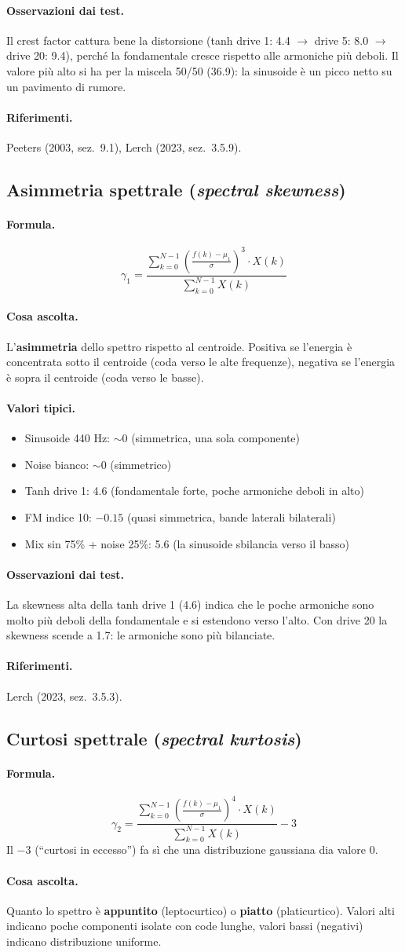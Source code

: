 \documentclass[a4paper,11pt]{article}
\newcommand{\desc}[1]{\subsection{#1}}
\newcommand{\formula}{\paragraph{Formula.}}
\newcommand{\ascolta}{\paragraph{Cosa ascolta.}}
\newcommand{\range}{\paragraph{Valori tipici.}}
\newcommand{\rif}{\paragraph{Riferimenti.}}
\newcommand{\oss}{\paragraph{Osservazioni dai test.}}
\begin{document}
\oss Il crest factor cattura bene la distorsione (tanh drive 1: 4.4 $\to$
drive 5: 8.0 $\to$ drive 20: 9.4), perché la fondamentale cresce
rispetto alle armoniche più deboli. Il valore più alto si ha per la
miscela 50/50 (36.9): la sinusoide è un picco netto su un pavimento
di rumore.

\rif Peeters (2003, sez.~9.1), Lerch (2023, sez.~3.5.9).

\desc{Asimmetria spettrale (\emph{spectral skewness})}

\formula
\[
  \gamma_1 = \frac{\displaystyle\sum_{k=0}^{N-1}
    \left(\frac{f(k) - \mu_1}{\sigma}\right)^3 \cdot X(k)}
    {\displaystyle\sum_{k=0}^{N-1} X(k)}
\]

\ascolta
L'\textbf{asimmetria} dello spettro rispetto al centroide. Positiva se
l'energia è concentrata sotto il centroide (coda verso le alte frequenze),
negativa se l'energia è sopra il centroide (coda verso le basse).

\range
\begin{itemize}[nosep]
  \item Sinusoide 440 Hz: $\sim 0$ (simmetrica, una sola componente)
  \item Noise bianco: $\sim 0$ (simmetrico)
  \item Tanh drive 1: 4.6 (fondamentale forte, poche armoniche deboli in alto)
  \item FM indice 10: $-0.15$ (quasi simmetrica, bande laterali bilaterali)
  \item Mix sin 75\% + noise 25\%: 5.6 (la sinusoide sbilancia verso il basso)
\end{itemize}

\oss La skewness alta della tanh drive 1 (4.6) indica che le poche
armoniche sono molto più deboli della fondamentale e si estendono
verso l'alto. Con drive 20 la skewness scende a 1.7: le armoniche
sono più bilanciate.

\rif Lerch (2023, sez.~3.5.3).

\desc{Curtosi spettrale (\emph{spectral kurtosis})}

\formula
\[
  \gamma_2 = \frac{\displaystyle\sum_{k=0}^{N-1}
    \left(\frac{f(k) - \mu_1}{\sigma}\right)^4 \cdot X(k)}
    {\displaystyle\sum_{k=0}^{N-1} X(k)} - 3
\]
Il $-3$ (``curtosi in eccesso'') fa sì che una distribuzione
gaussiana dia valore 0.

\ascolta
Quanto lo spettro è \textbf{appuntito} (leptocurtico) o \textbf{piatto}
(platicurtico). Valori alti indicano poche componenti isolate con code
lunghe, valori bassi (negativi) indicano distribuzione uniforme.
\end{document}
